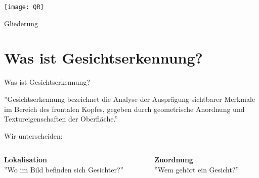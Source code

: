 \documentclass[10pt]{beamer}
\begin{document}
\maketitle


\begin{frame}
  \centering\texttt{[image: QR]}
\end{frame}

\begin{frame}{Gliederung}
  \tableofcontents
\end{frame}

\section{Was ist Gesichtserkennung?}

\begin{frame}{Was ist Gesichtserkennung?}

  ''Gesichtserkennung bezeichnet die Analyse der Ausprägung sichtbarer Merkmale im Bereich des frontalen Kopfes, gegeben durch geometrische Anordnung und Textureigenschaften der Oberfläche.'' \cite{WikiGesichtserkennung}
  \begin{center}
    Wir unterscheiden:
  \end{center}
  \begin{columns}
    \begin{column}{.5\textwidth}
      \begin{center}
        \textbf{Lokalisation}\\
        ''Wo im Bild befinden sich Gesichter?''
      \end{center}
    \end{column}
    \begin{column}{.5\textwidth}
      \begin{center}
        \textbf{Zuordnung}\\
        ''Wem gehört ein Gesicht?''
      \end{center}
    \end{column}
  \end{columns}

\end{frame}
\end{document}

